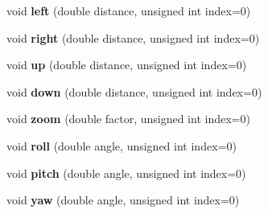 \begin{DoxyCompactItemize}
\item 
\hypertarget{classNetworkViewer_af9562ff09c492e8585949c81fc23d4ac}{void {\bfseries left} (double distance, unsigned int index=0)}\label{classNetworkViewer_af9562ff09c492e8585949c81fc23d4ac}

\item 
\hypertarget{classNetworkViewer_a5ed8a0eab674053dede6bc3067f43ac9}{void {\bfseries right} (double distance, unsigned int index=0)}\label{classNetworkViewer_a5ed8a0eab674053dede6bc3067f43ac9}

\item 
\hypertarget{classNetworkViewer_a0350eeac58d5853762a55aa805a790ae}{void {\bfseries up} (double distance, unsigned int index=0)}\label{classNetworkViewer_a0350eeac58d5853762a55aa805a790ae}

\item 
\hypertarget{classNetworkViewer_a4dc18dee6de49a7a882146d1dc042920}{void {\bfseries down} (double distance, unsigned int index=0)}\label{classNetworkViewer_a4dc18dee6de49a7a882146d1dc042920}

\item 
\hypertarget{classNetworkViewer_a68c39b3b90a5f3c847b6cc1c29ac1bdd}{void {\bfseries zoom} (double factor, unsigned int index=0)}\label{classNetworkViewer_a68c39b3b90a5f3c847b6cc1c29ac1bdd}

\item 
\hypertarget{classNetworkViewer_a52635efef221b6ad5c7d6b4e59f4f63e}{void {\bfseries roll} (double angle, unsigned int index=0)}\label{classNetworkViewer_a52635efef221b6ad5c7d6b4e59f4f63e}

\item 
\hypertarget{classNetworkViewer_a3ad896c71f1cac628029b621086fcc14}{void {\bfseries pitch} (double angle, unsigned int index=0)}\label{classNetworkViewer_a3ad896c71f1cac628029b621086fcc14}

\item 
\hypertarget{classNetworkViewer_aaa76f95495f6eac1861bd02d3fd7cfc6}{void {\bfseries yaw} (double angle, unsigned int index=0)}\label{classNetworkViewer_aaa76f95495f6eac1861bd02d3fd7cfc6}

\end{DoxyCompactItemize}
